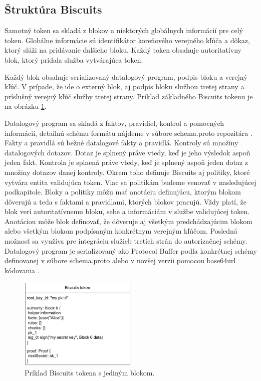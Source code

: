\subsection{Štruktúra Biscuits}

Samotný token sa skladá z blokov a niektorých globálnych informácií pre celý token. Globálne informácie sú identifikátor koreňového verejného kľúča a dôkaz, ktorý slúži na pridávanie ďalšieho bloku. Každý token obsahuje autoritatívny blok, ktorý pridala služba vytvárajúca token.

Každý blok obsahuje serializovaný datalogový program, podpis bloku a verejný kľúč. V prípade, že ide o externý blok, aj podpis bloku službou tretej strany a príslušný verejný kľúč služby tretej strany. Príklad základného Biscuits tokenu je na obrázku \ref{fig:biscuits_token}.

Datalogový program sa skladá z faktov, pravidiel, kontrol a pomocných informácií, detailnú schému formátu nájdeme v súbore schema.proto repozitára \cite{biscuits_git}. Fakty a pravidlá sú bežné datalogové fakty a pravidlá. Kontroly sú množiny datalogových dotazov. Dotaz je splnený práve vtedy, keď je jeho výsledok aspoň jeden fakt. Kontrola je splnená práve vtedy, keď je splnený aspoň jeden dotaz z množiny dotazov danej kontroly. Okrem toho definuje Biscuits aj politiky, ktoré vytvára entita validujúca token. Viac sa politikám budeme venovať v nasledujúcej podkapitole. Bloky a politiky môžu mať anotáciu definujúcu, ktorým blokom dôverujú a teda s faktami a pravidlami, ktorých blokov pracujú. Vždy platí, že blok verí autoritatívnemu bloku, sebe a informáciám v službe validujúcej token. Anotáciou môže blok definovať, že dôveruje aj všetkým predchádzajúcim blokom alebo všetkým blokom podpísaným konkrétnym verejným kľúčom. Posledná možnosť sa využíva pre integráciu služieb tretích strán do autorizačnej schémy.
Datalogový program je serializovaný ako Protocol Buffer \cite{protobuf} podľa konkrétnej schémy definovanej v súbore schema.proto alebo v novšej verzii pomocou base64url kódovania \cite{base64_rfc}.

\begin{figure}
    \centerline{\includegraphics[width=0.5\textwidth]{images/biscuits_token2}}
    \caption[Biscuits token]{Príklad Biscuits tokena s jediným blokom.}
    \label{fig:biscuits_token}
\end{figure}

